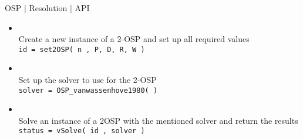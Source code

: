 %
% 
\begin{frame}{OSP $\mid$ Resolution $\mid$ API}

\begin{itemize}
\item  {}\\
          Create a new instance of a 2-OSP and set up all required values    \\
           \texttt{id = \texttt{{set2OSP}( n , P, D, R, W ) }} 
           \medskip
\item  {} \\
          Set up the solver to use for the 2-OSP\\
          \texttt{solver = OSP\_vanwassenhove1980( ) }
          \medskip
\item  {}\\
          Solve an instance of a 2OSP with the mentioned solver and return the results \\
          \texttt{status = vSolve( id , solver ) }
          \medskip
\end{itemize}

\end{frame}

